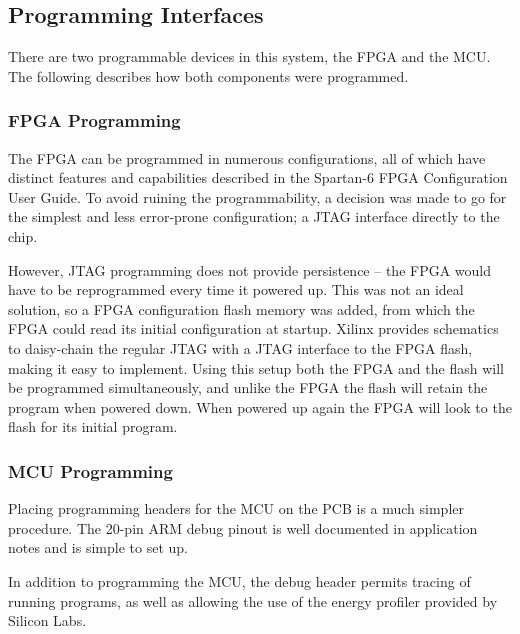 
\subsection{Programming Interfaces}

There are two programmable devices in this system, the FPGA and the MCU.
The following describes how both components were programmed.

\subsubsection{FPGA Programming}
The FPGA can be programmed in numerous configurations, all of which have
distinct features and capabilities described in the
Spartan-6 FPGA Configuration User Guide\cite{fpga:config-user-guide}. To avoid ruining the programmability, a
decision was made to go for the simplest and less error-prone configuration; a
JTAG interface directly to the chip.

However, JTAG programming does not provide persistence -- the FPGA would have to
be reprogrammed every time it powered up. This was not an ideal solution, so a
FPGA configuration flash memory was added, from which the FPGA could read its
initial configuration at startup. Xilinx provides schematics to daisy-chain the
regular JTAG with a JTAG interface to the FPGA flash, making it easy to
implement. Using this setup both the FPGA and the flash will be programmed
simultaneously, and unlike the FPGA the flash will retain the program when
powered down. When powered up again the FPGA will look to the flash for its
initial program.

\subsubsection{MCU Programming}
Placing programming headers for the MCU on the PCB is a much simpler procedure.
The 20-pin ARM debug pinout is well documented in application notes and is
simple to set up.

In addition to programming the MCU, the debug header permits tracing of running
programs, as well as allowing the use of the energy profiler provided by Silicon Labs.
